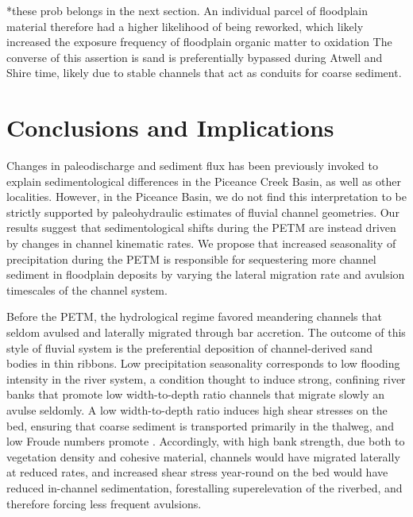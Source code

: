 \documentclass[draft]{compact_proposal}
\begin{document}
*these prob belongs in the next section.
  An individual parcel of floodplain material therefore had a higher likelihood of being reworked, which likely increased the exposure frequency of floodplain organic matter to oxidation
  The converse of this assertion is sand is preferentially bypassed during Atwell and Shire time, likely due to stable channels that act as conduits for coarse sediment.

\section{Conclusions and Implications}

Changes in paleodischarge and sediment flux has been previously invoked to explain sedimentological differences in the Piceance Creek Basin, as well as other localities.
However, in the Piceance Basin, we do not find this interpretation to be strictly supported by paleohydraulic estimates of fluvial channel geometries.
Our results suggest that sedimentological shifts during the PETM are instead driven by changes in channel kinematic rates.
We propose that increased seasonality of precipitation during the PETM is responsible for sequestering more channel sediment in floodplain deposits by varying the lateral migration rate and avulsion timescales of the channel system.

Before the PETM, the  hydrological regime favored meandering channels that seldom avulsed and laterally migrated through bar accretion.
The outcome of this style of fluvial system is the preferential deposition of channel-derived sand bodies in thin ribbons.
Low precipitation seasonality corresponds to low flooding intensity in the river system, a condition thought to induce strong, confining river banks that promote low width-to-depth ratio channels that migrate slowly an avulse seldomly.
A low width-to-depth ratio induces high shear stresses on the bed, ensuring that coarse sediment is transported primarily in the thalweg, and low Froude numbers promote \pnote[something].
Accordingly, with high bank strength, due both to vegetation density and cohesive material, channels would have migrated laterally at reduced rates, and increased shear stress year-round on the bed would have reduced in-channel sedimentation, forestalling superelevation of the riverbed, and therefore forcing less frequent avulsions.
\end{document}
